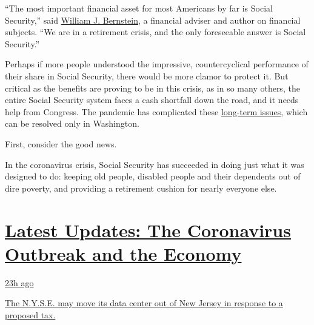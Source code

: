 ``The most important financial asset for most Americans by far is Social
Security,'' said
\href{https://www.nytimes3xbfgragh.onion/2014/05/04/your-money/a-path-to-retirement-for-those-far-from-it.html}{William
J. Bernstein}, a financial adviser and author on financial subjects.
``We are in a retirement crisis, and the only foreseeable answer is
Social Security.''

Perhaps if more people understood the impressive, countercyclical
performance of their share in Social Security, there would be more
clamor to protect it. But critical as the benefits are proving to be in
this crisis, as in so many others, the entire Social Security system
faces a cash shortfall down the road, and it needs help from Congress.
The pandemic has complicated these
\href{https://www.nytimes3xbfgragh.onion/2019/06/12/business/social-security-shortfall-2020.html}{long-term
issues}, which can be resolved only in Washington.

First, consider the good news.

In the coronavirus crisis, Social Security has succeeded in doing just
what it was designed to do: keeping old people, disabled people and
their dependents out of dire poverty, and providing a retirement cushion
for nearly everyone else.

\hypertarget{latest-updates-the-coronavirus-outbreak-and-the-economy}{%
\section{\texorpdfstring{\href{https://www.nytimes3xbfgragh.onion/live/2020/09/11/business/stock-market-today-coronavirus?action=click\&pgtype=Article\&state=default\&region=MAIN_CONTENT_1\&context=storylines_live_updates}{Latest
Updates: The Coronavirus Outbreak and the
Economy}}{Latest Updates: The Coronavirus Outbreak and the Economy}}\label{latest-updates-the-coronavirus-outbreak-and-the-economy}}

\href{https://www.nytimes3xbfgragh.onion/live/2020/09/11/business/stock-market-today-coronavirus?action=click\&pgtype=Article\&state=default\&region=MAIN_CONTENT_1\&context=storylines_live_updates\#the-nyse-may-move-its-data-center-out-of-new-jersey-in-response-to-a-proposed-tax}{23h
ago}

\href{https://www.nytimes3xbfgragh.onion/live/2020/09/11/business/stock-market-today-coronavirus?action=click\&pgtype=Article\&state=default\&region=MAIN_CONTENT_1\&context=storylines_live_updates\#the-nyse-may-move-its-data-center-out-of-new-jersey-in-response-to-a-proposed-tax}{The
N.Y.S.E. may move its data center out of New Jersey in response to a
proposed tax.}

